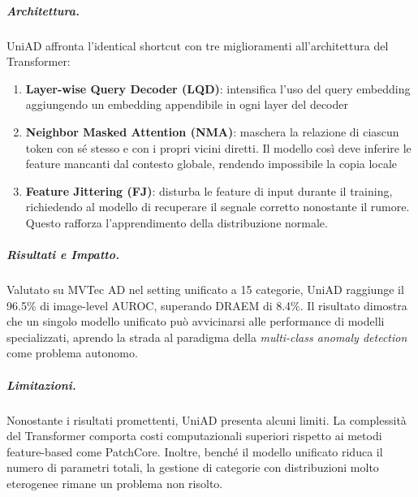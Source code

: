 \subparagraph{Architettura.}
UniAD affronta l'identical shortcut con tre miglioramenti all'architettura del Transformer:

\begin{enumerate}
    \item \textbf{Layer-wise Query Decoder (LQD)}: intensifica l'uso del query embedding aggiungendo un embedding appendibile in ogni layer del decoder
    
    \item \textbf{Neighbor Masked Attention (NMA)}: maschera la relazione di ciascun token con sé stesso e con i propri vicini diretti. Il modello così deve inferire le feature mancanti dal contesto globale, rendendo impossibile la copia locale
    
    \item \textbf{Feature Jittering (FJ)}: disturba le feature di input durante il training, richiedendo al modello di recuperare il segnale corretto nonostante il rumore. Questo rafforza l'apprendimento della distribuzione normale.
\end{enumerate}

\subparagraph{Risultati e Impatto.}
Valutato su MVTec AD nel setting unificato a 15 categorie, UniAD raggiunge il 96.5\% di image-level AUROC, superando DRAEM di 8.4\%. Il risultato dimostra che un singolo modello unificato può avvicinarsi alle performance di modelli specializzati, aprendo la strada al pa\-ra\-dig\-ma della \textit{multi-class anomaly detection} come problema autonomo.

\subparagraph{Limitazioni.}
Nonostante i risultati promettenti, UniAD presenta alcuni limiti. La complessità del Transformer comporta costi computazionali superiori rispetto ai metodi feature-based come PatchCore. Inoltre, benché il modello unificato riduca il numero di parametri totali, la gestione di categorie con distribuzioni molto eterogenee rimane un problema non risolto.

